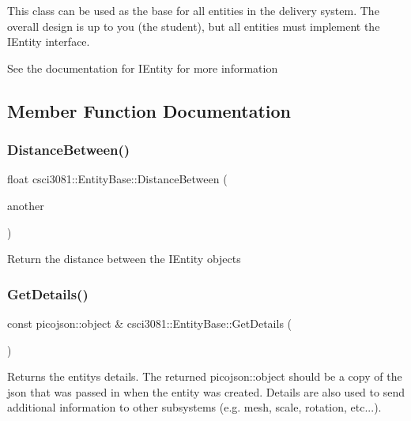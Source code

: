 This class can be used as the base for all entities in the delivery system. The overall design is up to you (the student), but all entities must implement the I\+Entity interface.

See the documentation for I\+Entity for more information 

\subsection{Member Function Documentation}
\mbox{\label{classcsci3081_1_1EntityBase_a41270ec9049d9d0a379987ab95796bd9}} 
\subsubsection{\texorpdfstring{Distance\+Between()}{DistanceBetween()}}
{\footnotesize\ttfamily float csci3081\+::\+Entity\+Base\+::\+Distance\+Between (\begin{DoxyParamCaption}\item[{\hyperlink{classentity__project_1_1IEntity}{I\+Entity} $\ast$}]{another }\end{DoxyParamCaption})}

Return the distance between the I\+Entity objects \mbox{\label{classcsci3081_1_1EntityBase_aed18a7db12bfc8d6908ac6c28078110c}} 
\subsubsection{\texorpdfstring{Get\+Details()}{GetDetails()}}
{\footnotesize\ttfamily const picojson\+::object \& csci3081\+::\+Entity\+Base\+::\+Get\+Details (\begin{DoxyParamCaption}{ }\end{DoxyParamCaption})\hspace{0.3cm}{\ttfamily [virtual]}}

Returns the entity\textquotesingle{}s details. The returned picojson\+::object should be a copy of the json that was passed in when the entity was created. Details are also used to send additional information to other subsystems (e.\+g. mesh, scale, rotation, etc...). 

